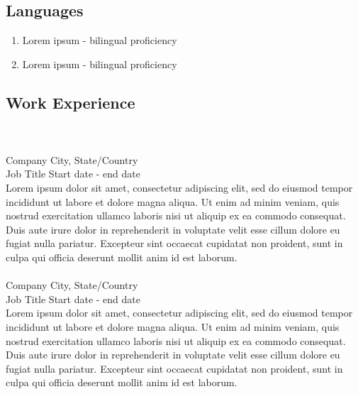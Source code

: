 \documentclass{resume_template}
\begin{document}
\begin{tcolorbox}[colframe=white,colback=white,arc=0mm]
\begin{minipage}[t]{3in}
\begin{tcolorbox}[colframe=secondary,colback=secondary,arc=0mm,height=8.405in]
			\section*{Languages}
			\vspace*{-0.2in}
			\hrulefill
			\begin{enumerate}[\indent {}]
				\item Lorem ipsum - bilingual proficiency
				\item Lorem ipsum - bilingual proficiency
			\end{enumerate}
		\end{tcolorbox}
	\end{minipage}
	\begin{minipage}[t]{5.25in}
		\vspace*{-0.125in}
		\begin{tcolorbox}[colframe=white,colback=white,arc=0mm,height=8.405in]
			\section*{Work Experience}
			\vspace*{-0.2in}
			\hrulefill\\\\
			Company \hfill City, State/Country \\
			Job Title \hfill Start date - end date \\
			Lorem ipsum dolor sit amet, consectetur adipiscing elit, sed do eiusmod tempor incididunt ut labore et dolore magna aliqua. Ut enim ad minim veniam, quis nostrud exercitation ullamco laboris nisi ut aliquip ex ea commodo consequat. Duis aute irure dolor in reprehenderit in voluptate velit esse cillum dolore eu fugiat nulla pariatur. Excepteur sint occaecat cupidatat non proident, sunt in culpa qui officia deserunt mollit anim id est laborum.\\\\
			Company \hfill City, State/Country \\
			Job Title \hfill Start date - end date \\
			Lorem ipsum dolor sit amet, consectetur adipiscing elit, sed do eiusmod tempor incididunt ut labore et dolore magna aliqua. Ut enim ad minim veniam, quis nostrud exercitation ullamco laboris nisi ut aliquip ex ea commodo consequat. Duis aute irure dolor in reprehenderit in voluptate velit esse cillum dolore eu fugiat nulla pariatur. Excepteur sint occaecat cupidatat non proident, sunt in culpa qui officia deserunt mollit anim id est laborum.			

\end{tcolorbox}
\end{minipage}
\end{tcolorbox}
\end{document}
